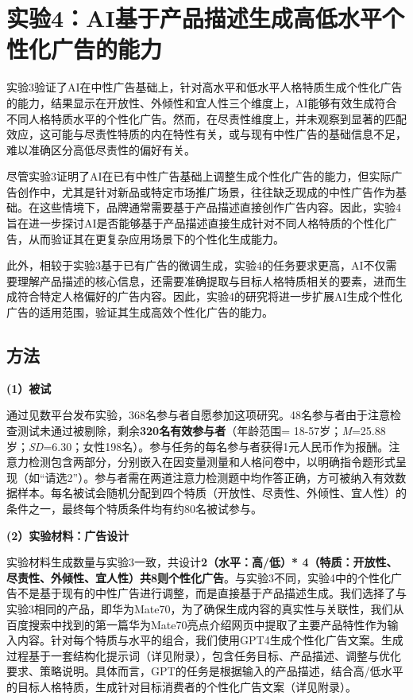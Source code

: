 \section{实验4：AI基于产品描述生成高低水平个性化广告的能力}

实验3验证了AI在中性广告基础上，针对高水平和低水平人格特质生成个性化广告的能力，结果显示在开放性、外倾性和宜人性三个维度上，AI能够有效生成符合不同人格特质水平的个性化广告。然而，在尽责性维度上，并未观察到显著的匹配效应，这可能与尽责性特质的内在特性有关，或与现有中性广告的基础信息不足，难以准确区分高低尽责性的偏好有关。

尽管实验3证明了AI在已有中性广告基础上调整生成个性化广告的能力，但实际广告创作中，尤其是针对新品或特定市场推广场景，往往缺乏现成的中性广告作为基础。在这些情境下，品牌通常需要基于产品描述直接创作广告内容。因此，实验4旨在进一步探讨AI是否能够基于产品描述直接生成针对不同人格特质的个性化广告，从而验证其在更复杂应用场景下的个性化生成能力。

此外，相较于实验3基于已有广告的微调生成，实验4的任务要求更高，AI不仅需要理解产品描述的核心信息，还需要准确提取与目标人格特质相关的要素，进而生成符合特定人格偏好的广告内容。因此，实验4的研究将进一步扩展AI生成个性化广告的适用范围，验证其生成高效个性化广告的能力。

\subsection{方法}


\textbf{(1）被试}

通过见数平台发布实验，368名参与者自愿参加这项研究。48名参与者由于注意检查测试未通过被剔除，剩余\textbf{320名有效参与者}（年龄范围= 18-57岁；\textit{M}=25.88岁；\textit{SD}=6.30；女性198名）。参与任务的每名参与者获得1元人民币作为报酬。注意力检测包含两部分，分别嵌入在因变量测量和人格问卷中，以明确指令题形式呈现（如“请选2”）。参与者需在两道注意力检测题中均作答正确，方可被纳入有效数据样本。每名被试会随机分配到四个特质（开放性、尽责性、外倾性、宜人性）的条件之一，最终每个特质条件均有约80名被试参与。


\textbf{(2）实验材料：广告设计}

实验材料生成数量与实验3一致，共设计\textbf{2（水平：高/低）* 4（特质：开放性、尽责性、外倾性、宜人性）共8则个性化广告}。与实验3不同，实验4中的个性化广告不是基于现有的中性广告进行调整，而是直接基于产品描述生成。我们选择了与实验3相同的产品，即华为Mate70，为了确保生成内容的真实性与关联性，我们从百度搜索中找到的第一篇华为Mate70亮点介绍网页中提取了主要产品特性作为输入内容。针对每个特质与水平的组合，我们使用GPT4生成个性化广告文案。生成过程基于一套结构化提示词（详见附录），包含任务目标、产品描述、调整与优化要求、策略说明。具体而言，GPT的任务是根据输入的产品描述，结合高/低水平的目标人格特质，生成针对目标消费者的个性化广告文案（详见附录）。

